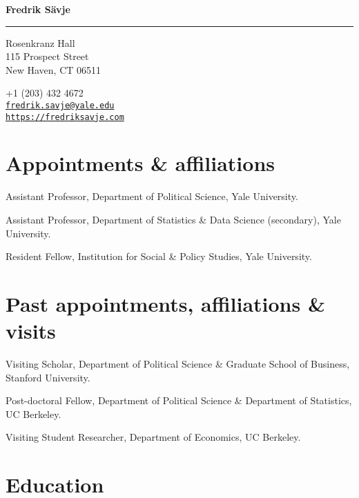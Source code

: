 \documentclass[10pt,letterpaper]{article}
\newenvironment{datelist}{
	\begin{list}{}{
		\setlength{\parskip}{0pt}
		\setlength{\itemsep}{4pt}
		\setlength{\parsep}{0.3em}
		\setlength{\leftmargin}{5.85em}
		\setlength{\labelwidth}{5.85em}
		\setlength{\labelsep}{1.5em}
		}
	}{
\end{list}
}
\newcommand{\dateitem}[2][]{\item[{#1}] {#2}}
\newenvironment{infolist}{
	\begin{list}{}{
		\setlength{\parskip}{0pt}
		\setlength{\itemsep}{4pt}
		\setlength{\parsep}{0.3em}
		\setlength{\leftmargin}{0em}
		\setlength{\labelwidth}{0em}
		}
	}{
\end{list}
}
\newcommand{\infoitem}[1]{\item {#1}}
\begin{document}
	{\huge \bf Fredrik Sävje}

	\rule{\textwidth}{1pt}

	\bigskip


	\begin{minipage}[t]{0.495\textwidth}
		Rosenkranz Hall \\
		115 Prospect Street \\
		New Haven, CT 06511
	\end{minipage}
	\begin{minipage}[t]{0.495\textwidth}
		+1 (203) 432 4672 \\
		\href{mailto:fredrik.savje@yale.edu}{\texttt{fredrik.savje@yale.edu}} \\
		\href{https://fredriksavje.com}{\texttt{https://fredriksavje.com}}
	\end{minipage}

	\vspace{0.3in}


	\section*{Appointments \& affiliations}

	\begin{infolist}
		\infoitem{Assistant Professor, Department of Political Science, Yale University.}
		\infoitem{Assistant Professor, Department of Statistics \& Data Science (secondary), Yale University.}
		\infoitem{Resident Fellow, Institution for Social \& Policy Studies, Yale University.}
	\end{infolist}


	\section*{Past appointments, affiliations \& visits}

	\begin{datelist}
		\dateitem[2019--2020]{Visiting Scholar, Department of Political Science \& Graduate School of Business, Stanford University.}
		\dateitem[2015--2017]{Post-doctoral Fellow, Department of Political Science \& Department of Statistics, UC Berkeley.}
		\dateitem[2013--2014]{Visiting Student Researcher, Department of Economics, UC Berkeley.}
	\end{datelist}


	\section*{Education}
\end{document}
